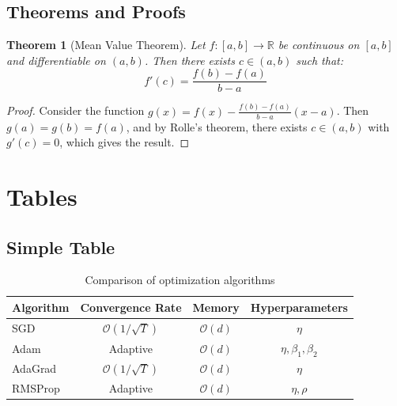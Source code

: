 \documentclass[11pt,a4paper]{article}
\newtheorem{theorem}{Theorem}[section]
\begin{document}
\subsection{Theorems and Proofs}

\begin{theorem}[Mean Value Theorem]
    Let $f: [a, b] \rightarrow \mathbb{R}$ be continuous on $[a, b]$ and differentiable
    on $(a, b)$. Then there exists $c \in (a, b)$ such that:
    \begin{equation}
        f'(c) = \frac{f(b) - f(a)}{b - a}
    \end{equation}
\end{theorem}

\begin{proof}
    Consider the function $g(x) = f(x) - \frac{f(b)-f(a)}{b-a}(x-a)$. Then $g(a) = g(b) = f(a)$,
    and by Rolle's theorem, there exists $c \in (a, b)$ with $g'(c) = 0$, which gives the result.
\end{proof}

\section{Tables}

\subsection{Simple Table}
\begin{table}[htbp]
    \centering
    \caption{Comparison of optimization algorithms}
    \label{tab:optimizers}
    \begin{tabular}{@{}lccc@{}}
        \toprule
        Algorithm & Convergence Rate & Memory & Hyperparameters \\
        \midrule
        SGD       & $\mathcal{O}(1/\sqrt{T})$ & $\mathcal{O}(d)$ & $\eta$ \\
        Adam      & Adaptive    & $\mathcal{O}(d)$ & $\eta, \beta_1, \beta_2$ \\
        AdaGrad   & $\mathcal{O}(1/\sqrt{T})$ & $\mathcal{O}(d)$ & $\eta$ \\
        RMSProp   & Adaptive    & $\mathcal{O}(d)$ & $\eta, \rho$ \\
        \bottomrule
    \end{tabular}
\end{table}
\end{document}
